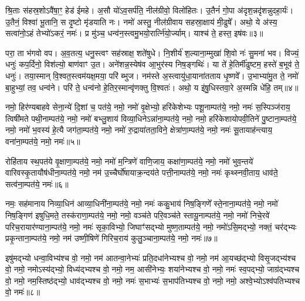 श्रि॒ताः स॑हस्र॒शो\-ऽवै॑षा॒ꣳ॒ हेड॑ ईमहे। अ॒सौ यो॑\-ऽव॒सर्प॑ति॒ नील॑ग्रीवो॒ विलो॑हितः। उ॒तैनं॑ गो॒पा अ॑दृश॒न्नदृ॑शन्नुदहा॒र्यः॑। उ॒तैनं॒ विश्वा॑ भू॒तानि॒ स दृ॒ष्टो मृ॑डयाति नः। नमो॑ अस्तु॒ नील॑ग्रीवाय सहस्रा॒क्षाय॑ मी॒ढुषे᳚। अथो॒ ये अ॑स्य॒ सत्वा॑नो॒\-ऽहं तेभ्यो॑\-ऽकरं॒ नमः॑। प्र मु॑ञ्च॒ धन्व॑न॒स्त्वमु॒भयो॒रार्त्नि॑यो॒र्ज्याम्। याश्च॑ ते॒ हस्त॒ इष॑वः॥३॥

परा॒ ता भ॑गवो वप। अ॒व॒तत्य॒ धनु॒स्त्वꣳ सह॑स्राक्ष॒ शते॑षुधे। नि॒शीर्य॑ श॒ल्याना॒म्मुखा॑ शि॒वो नः॑ सु॒मना॑ भव। विज्यं॒ धनुः॑ कप॒र्दिनो॒ विश॑ल्यो॒ बाण॑वाꣳ उ॒त। अने॑शन्न॒स्येष॑व आ॒भुर॑स्य निष॒ङ्गथिः॑। या ते॑ हे॒तिर्मी॑ढुष्टम॒ हस्ते॑ ब॒भूव॑ ते॒ धनुः॑। तया॒स्मान् वि॒श्वत॒स्त्वम॑यक्ष॒मया॒ परि॑ ब्भुज। नम॑स्ते अ॒स्त्वायु॑धा॒याना॑तताय धृ॒ष्णवे᳚। उ॒भाभ्या॑मु॒त ते॒ नमो॑ बा॒हुभ्यां॒ तव॒ धन्व॑ने। परि॑ ते॒ धन्व॑नो हे॒तिर॒स्मान्वृ॑णक्तु वि॒श्वतः॑। अथो॒ य इ॑षु॒धिस्तवा॒रे अ॒स्मन्नि धे॑हि॒ तम्॥४॥

{\anuvakamend[{हस्ते॑ दि॒क्ष्विष॑व उ॒भाभ्यां॒ द्वाविꣳ॑शतिश्च॥१॥}]}

नमो॒ हिर॑ण्यबाहवे सेना॒न्ये॑ दि॒शां च॒ पत॑ये॒ नमो॒ नमो॑ वृ॒क्षेभ्यो॒ हरि॑केशेभ्यः पशू॒नाम्पत॑ये॒ नमो॒ नमः॑ स॒स्पिञ्ज॑राय॒ त्विषी॑मते पथी॒नाम्पत॑ये॒ नमो॒ नमो॑ बभ्लु॒शाय॑ विव्या॒धिने\-ऽन्ना॑ना॒म्पत॑ये॒ नमो॒ नमो॒ हरि॑केशायोपवी॒तिने॑ पु॒ष्टाना॒म्पत॑ये॒ नमो॒ नमो॑ भ॒वस्य॑ हे॒त्यै जग॑ता॒म्पत॑ये॒ नमो॒ नमो॑ रु॒द्राया॑तता॒विने॒ क्षेत्रा॑णा॒म्पत॑ये॒ नमो॒ नमः॑ सू॒तायाह॑न्त्याय॒ वना॑ना॒म्पत॑ये॒ नमो॒ नमः॑॥५॥

रोहि॑ताय स्थ॒पत॑ये वृ॒क्षाणा॒म्पत॑ये॒ नमो॒ नमो॑ म॒न्त्रिणे॑ वाणि॒जाय॒ कक्षा॑णा॒म्पत॑ये॒ नमो॒ नमो॑ भुव॒न्तये॑ वारिवस्कृ॒तायौष॑धीना॒म्पत॑ये॒ नमो॒ नम॑ उ॒च्चैर्घो॑षायाक्र॒न्दय॑ते पत्ती॒नाम्पत॑ये॒ नमो॒ नमः॑ कृथ्स्नवी॒ताय॒ धाव॑ते॒ सत्व॑ना॒म्पत॑ये॒ नमः॑॥६॥

{\anuvakamend[{वना॑ना॒म्पत॑ये॒ नमो॒ नम॒ एका॒न्नत्रि॒ꣳ॒शच्च॑॥२॥}]}

नमः॒ सह॑मानाय निव्या॒धिन॑ आव्या॒धिनी॑ना॒म्पत॑ये॒ नमो॒ नमः॑ ककु॒भाय॑ निष॒ङ्गिणे᳚ स्ते॒नाना॒म्पत॑ये॒ नमो॒ नमो॑ निष॒ङ्गिण॑ इषुधि॒मते॒ तस्क॑राणा॒म्पत॑ये॒ नमो॒ नमो॒ वञ्च॑ते परि॒वञ्च॑ते स्तायू॒नाम्पत॑ये॒ नमो॒ नमो॑ निचे॒रवे॑ परिच॒रायार॑ण्याना॒म्पत॑ये॒ नमो॒ नमः॑ सृका॒विभ्यो॒ जिघाꣳ॑सद्भ्यो मुष्ण॒ताम्पत॑ये॒ नमो॒ नमो॑\-ऽसि॒मद्भ्यो॒ नक्तं॒ चर॑द्भ्यः प्रकृ॒न्ताना॒म्पत॑ये॒ नमो॒ नम॑ उष्णी॒षिणे॑ गिरिच॒राय॑ कुलु॒ञ्चाना॒म्पत॑ये॒ नमो॒ नमः॑॥७॥

इषु॑मद्भ्यो धन्वा॒विभ्य॑श्च वो॒ नमो॒ नम॑ आतन्वा॒नेभ्यः॑ प्रति॒दधा॑नेभ्यश्च वो॒ नमो॒ नम॑ आ॒यच्छ॑द्भ्यो विसृ॒जद्भ्य॑श्च वो॒ नमो॒ नमो\-ऽस्य॑द्भ्यो॒ विध्य॑द्भ्यश्च वो॒ नमो॒ नम॒ आसी॑नेभ्यः॒ शया॑नेभ्यश्च वो॒ नमो॒ नमः॑ स्व॒पद्भ्यो॒ जाग्र॑द्भ्यश्च वो॒ नमो॒ नम॒स्तिष्ठ॑द्भ्यो॒ धाव॑द्भ्यश्च वो॒ नमो॒ नमः॑ स॒भाभ्यः॑ स॒भाप॑तिभ्यश्च वो॒ नमो॒ नमो॒ अश्वे॒भ्यो\-ऽश्व॑पतिभ्यश्च वो॒ नमः॑॥८॥

